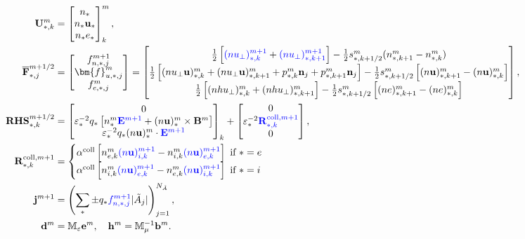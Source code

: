 \documentclass{article}
\begin{document}
\begin{align}
    \mathbf{U}_{*,k}^{m} &=
    \begin{bmatrix}
    n_* \\
    n_* \mathbf{u}_* \\
    n_* e_*
    \end{bmatrix}^m_k, \\
    \overline{\mathbf{F}}_{*,j}^{m+1/2} &=
    \begin{bmatrix}
    f^{m+1}_{n,*,j} \\
    \bm{f}^m_{u,*,j} \\
    f^m_{e,*,j} 
    \end{bmatrix}
    = 
    \begin{bmatrix}
    \frac{1}{2}\left[\textcolor{blue}{(nu_{\bot})_{*,k}^{m+1}} + \textcolor{blue}{(nu_{\bot})_{*,k+1}^{m+1}}\right] - \frac{1}{2}s^m_{*,k+1/2}(n_{*,k+1}^m - n_{*,k}^m) \\
    \frac{1}{2}\left[(nu_{\bot}\mathbf{u})^m_{*,k} + (nu_{\bot}\mathbf{u})^m_{*,k+1} + p_{*,k}^m\mathbf{n}_j + p_{*,k+1}^m\mathbf{n}_j\right] - \frac{1}{2}s^m_{*,k+1/2}\left[(n\mathbf{u})^m_{*,k+1} - (n\mathbf{u})^m_{*,k}\right] \\
    \frac{1}{2}\left[(nhu_\bot)^m_{*,k} + (nhu_\bot)^m_{*,k+1}\right] - \frac{1}{2}s^m_{*,k+1/2}\left[(ne)^m_{*,k+1} - (ne)^m_{*,k}\right]
    \end{bmatrix}, \label{equ:flux_ap}\\
    \mathbf{RHS}_{*,k}^{m+1/2} &=
    \begin{bmatrix}
    0 \\
    \varepsilon_*^{-2}q_*\left[n_*^m\textcolor{blue}{\mathbf{E}^{m+1}} + (n\mathbf{u})^m_*\times\mathbf{B}^m\right] \\
    \varepsilon_*^{-2}q_*(n\mathbf{u})^m_* \cdot \textcolor{blue}{\mathbf{E}^{m+1}}
    \end{bmatrix}_k +
    \begin{bmatrix}
    0 \\
    \varepsilon_*^{-2}\textcolor{blue}{\mathbf{R}_{*,k}^{\text{coll},m+1}} \\
    0
    \end{bmatrix}, \label{equ:rhs_ap}\\
    \mathbf{R}_{*,k}^{\text{coll},m+1} &= 
    \begin{cases}
    \alpha^\text{coll}\left[n_{e,k}^m\textcolor{blue}{(n\mathbf{u})^{m+1}_{i,k}} - n_{i,k}^m\textcolor{blue}{(n\mathbf{u})^{m+1}_{e,k}}\right] \text{  if  } * = e \\
    \alpha^\text{coll}\left[n_{i,k}^m\textcolor{blue}{(n\mathbf{u})^{m+1}_{e,k}} - n_{e,k}^m\textcolor{blue}{(n\mathbf{u})^{m+1}_{i,k}}\right] \text{  if  } * = i
    \end{cases}  \\
    \mathbf{j}^{m+1} &= \left(\sum_*\pm q_*\textcolor{blue}{f^{m+1}_{n,*,j}}|\Tilde{A}_j|\right)_{j=1}^{N_{\Tilde{A}}}, \label{equ:current_ap}\\
    \mathbf{d}^m &= \mathbb{M}_\varepsilon \mathbf{e}^m, \ \ \ \mathbf{h}^m = \mathbb{M}_\mu^{-1} \mathbf{b}^m. \label{equ:material_law}
\end{align}
\end{document}
